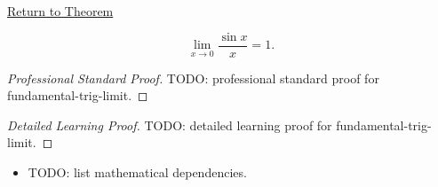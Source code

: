 \newpage
{}
\label{prf:fundamental-trig-limit}

\begin{remark*}[Return]
\hyperref[thm:fundamental-trig-limit]{Return to Theorem}
\end{remark*}

\begin{theorem*}
\[
  \lim_{x \to 0} \frac{\sin x}{x} = 1.
\]

\smallskip\noindent
\end{theorem*}

\begin{proof}[Professional Standard Proof]
\LRAProofBodyStart
TODO: professional standard proof for fundamental-trig-limit.
\end{proof}

\begin{proof}[Detailed Learning Proof]
\LRAProofBodyStart
TODO: detailed learning proof for fundamental-trig-limit.
\end{proof}

\begin{remark*}
\end{remark*}

\begin{dependencies}
\begin{itemize}
  \item TODO: list mathematical dependencies.
\end{itemize}
\end{dependencies}

\clearpage

